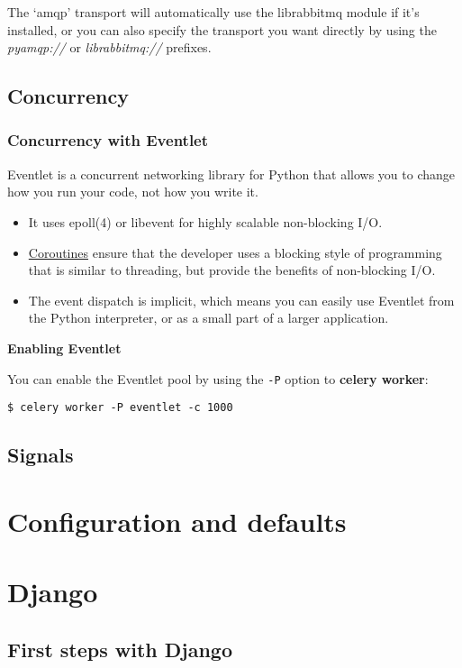 \documentclass[9pt,a4paper]{article}
\begin{document}
\begin{CJK*}{GBK}{kai}
The ‘amqp’ transport will automatically use the librabbitmq module if it’s installed, or you can also specify the transport you want directly by using the \textit{pyamqp://} or \textit{librabbitmq://} prefixes.

\subsection{Concurrency}
\subsubsection{Concurrency with Eventlet}

Eventlet is a concurrent networking library for Python that allows you to change how you run your code, not how you write it.

\begin{itemize}
\item It uses epoll(4) or libevent for highly scalable non-blocking I/O.
\item \href{http://en.wikipedia.org/wiki/Coroutine}{Coroutines} ensure that the developer uses a blocking style of programming that is similar to threading, but provide the benefits of non-blocking I/O.
\item The event dispatch is implicit, which means you can easily use Eventlet from the Python interpreter, or as a small part of a larger application.
\end{itemize}

\textbf{Enabling Eventlet}

You can enable the Eventlet pool by using the \verb"-P" option to \textbf{celery worker}:
\begin{Verbatim}[frame=single]
$ celery worker -P eventlet -c 1000
\end{Verbatim}

\subsection{Signals}

\section{Configuration and defaults}

\section{Django}

\subsection{First steps with Django}


\end{CJK*}
\end{document}
